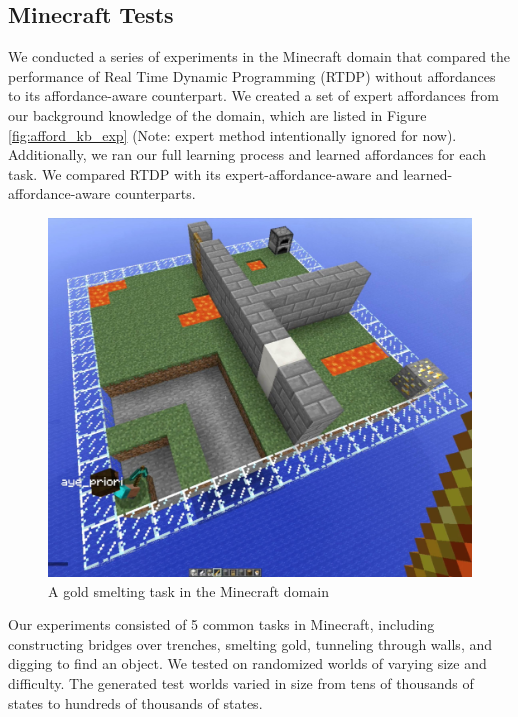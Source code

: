 \documentclass[conference]{IEEEtran}
\begin{document}
\subsection{Minecraft Tests}
We conducted a series of experiments in the Minecraft domain that
compared the performance of Real Time Dynamic Programming (RTDP)
without affordances to its affordance-aware counterpart. We created a set of expert
affordances from our background knowledge of the domain, which are
listed in Figure \ref{fig:afford_kb_exp} (Note: expert method intentionally ignored for now). Additionally, we ran our full
learning process and learned affordances for each task. We compared
RTDP with its expert-affordance-aware and learned-affordance-aware 
counterparts. 



\begin{figure}[t]
\centering
\includegraphics[scale=0.13]{figures/epicworld_1.jpg}%
  \caption{A gold smelting task in the Minecraft domain}
  \label{fig:minecraft}
\end{figure}

Our experiments consisted of 5 common tasks in Minecraft, including
constructing bridges over trenches, smelting gold, tunneling
through walls, and digging to find an object.  We tested on 
randomized worlds of varying size and difficulty. The generated test
worlds varied in size from tens of thousands of states to hundreds of thousands of states.
\end{document}

